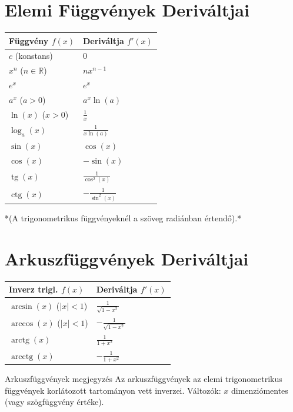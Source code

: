 \documentclass[10pt,a4paper,twocolumn]{article}
\begin{document}
\section{Elemi Függvények Deriváltjai}

\begin{center}
\small
\begin{tabular}{ll}
\toprule
\textbf{Függvény $f(x)$} & \textbf{Deriváltja $f'(x)$} \\
\midrule
$c$ (konstans) & $0$ \\
$x^n$ ($n \in \mathbb{R}$) & $n x^{n-1}$ \\
$e^x$ & $e^x$ \\
$a^x$ ($a > 0$) & $a^x \ln(a)$ \\
$\ln(x)$ ($x > 0$) & $\frac{1}{x}$ \\
$\log_a(x)$ & $\frac{1}{x \ln(a)}$ \\
$\sin(x)$ & $\cos(x)$ \\
$\cos(x)$ & $-\sin(x)$ \\
$\operatorname{tg}(x)$ & $\frac{1}{\cos^2(x)}$ \\
$\operatorname{ctg}(x)$ & $-\frac{1}{\sin^2(x)}$ \\
\bottomrule
\end{tabular}
\end{center}
\vspace{-1em}
*(A trigonometrikus függvényeknél a szöveg radiánban értendő).*

\section{Arkuszfüggvények Deriváltjai}

\begin{center}
\small
\begin{tabular}{ll}
\toprule
\textbf{Inverz trigl. $f(x)$} & \textbf{Deriváltja $f'(x)$} \\
\midrule
$\arcsin(x)$ ($|x|<1$) & $\frac{1}{\sqrt{1-x^2}}$ \\
$\arccos(x)$ ($|x|<1$) & $-\frac{1}{\sqrt{1-x^2}}$ \\
$\operatorname{arctg}(x)$ & $\frac{1}{1+x^2}$ \\
$\operatorname{arcctg}(x)$ & $-\frac{1}{1+x^2}$ \\
\bottomrule
\end{tabular}
\end{center}
\vspace{-1em}
\begin{fogalombox}{Arkuszfüggvények megjegyzés}
Az arkuszfüggvények az elemi trigonometrikus függvények korlátozott tartományon vett inverzei. Változók: $x$ dimenziómentes (vagy szögfüggvény értéke).
\end{fogalombox}
\end{document}

